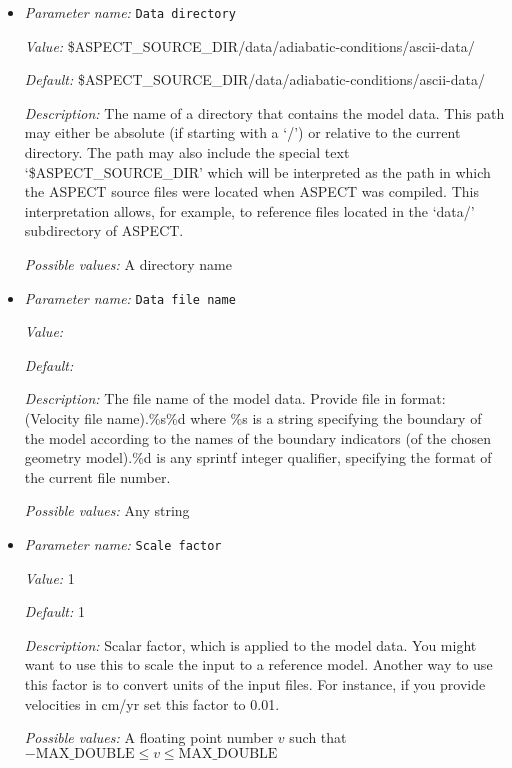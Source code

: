 \begin{itemize}
\item {\it Parameter name:} {\tt Data directory}
\label{parameters:Material model/Ascii reference profile/Ascii data model/Data directory}


{\it Value:} \$ASPECT\_SOURCE\_DIR/data/adiabatic-conditions/ascii-data/


{\it Default:} \$ASPECT\_SOURCE\_DIR/data/adiabatic-conditions/ascii-data/


{\it Description:} The name of a directory that contains the model data. This path may either be absolute (if starting with a `/') or relative to the current directory. The path may also include the special text `\$ASPECT\_SOURCE\_DIR' which will be interpreted as the path in which the ASPECT source files were located when ASPECT was compiled. This interpretation allows, for example, to reference files located in the `data/' subdirectory of ASPECT. 


{\it Possible values:} A directory name
\item {\it Parameter name:} {\tt Data file name}
\label{parameters:Material model/Ascii reference profile/Ascii data model/Data file name}


{\it Value:} 


{\it Default:} 


{\it Description:} The file name of the model data. Provide file in format: (Velocity file name).\%s\%d where \%s is a string specifying the boundary of the model according to the names of the boundary indicators (of the chosen geometry model).\%d is any sprintf integer qualifier, specifying the format of the current file number. 


{\it Possible values:} Any string
\item {\it Parameter name:} {\tt Scale factor}
\label{parameters:Material model/Ascii reference profile/Ascii data model/Scale factor}


{\it Value:} 1


{\it Default:} 1


{\it Description:} Scalar factor, which is applied to the model data. You might want to use this to scale the input to a reference model. Another way to use this factor is to convert units of the input files. For instance, if you provide velocities in cm/yr set this factor to 0.01.


{\it Possible values:} A floating point number $v$ such that $-\text{MAX\_DOUBLE} \leq v \leq \text{MAX\_DOUBLE}$
\end{itemize}

